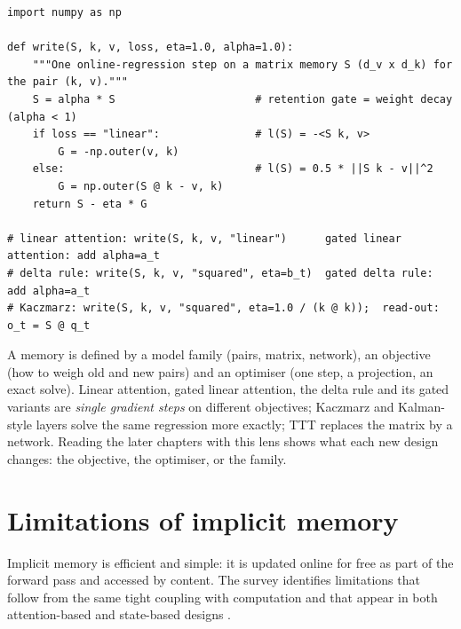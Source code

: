 \begin{lstlisting}[caption={Reference implementation (ours): write rules as one gradient step on a regression loss (NumPy).},label={lst:c02-rules}]
import numpy as np

def write(S, k, v, loss, eta=1.0, alpha=1.0):
    """One online-regression step on a matrix memory S (d_v x d_k) for the pair (k, v)."""
    S = alpha * S                      # retention gate = weight decay (alpha < 1)
    if loss == "linear":               # l(S) = -<S k, v>
        G = -np.outer(v, k)
    else:                              # l(S) = 0.5 * ||S k - v||^2
        G = np.outer(S @ k - v, k)
    return S - eta * G

# linear attention: write(S, k, v, "linear")      gated linear attention: add alpha=a_t
# delta rule: write(S, k, v, "squared", eta=b_t)  gated delta rule: add alpha=a_t
# Kaczmarz: write(S, k, v, "squared", eta=1.0 / (k @ k));  read-out: o_t = S @ q_t
\end{lstlisting}

\begin{keyidea}[title={Key idea: the write rule is an optimiser}]
A memory is defined by a model family (pairs, matrix, network), an objective (how to weigh old and
new pairs) and an optimiser (one step, a projection, an exact solve). Linear attention, gated
linear attention, the delta rule and its gated variants are \emph{single gradient steps} on
different objectives; Kaczmarz and Kalman-style layers solve the same regression more exactly; TTT
replaces the matrix by a network. Reading the later chapters with this lens shows what each new
design changes: the objective, the optimiser, or the family.
\end{keyidea}

\section{Limitations of implicit memory}\label{sec:c02-implicit-limits}

Implicit memory is efficient and simple: it is updated online for free as part of the forward
pass and accessed by content. The survey identifies limitations that follow from the same tight
coupling with computation and that appear in both attention-based and state-based designs
\citep[\S III-D]{zhoubian2026memory}.

